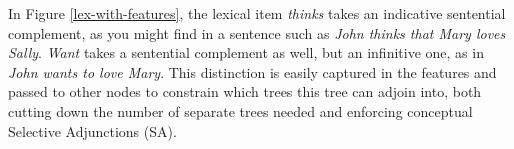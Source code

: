 In Figure \ref{lex-with-features}, the lexical item {\it thinks} takes an
indicative sentential complement, as you might find in a sentence such as {\it
John thinks that Mary loves Sally}.  {\it Want} takes a sentential complement
as well, but an infinitive one, as in {\it John wants to love Mary}.  This
distinction is easily captured in the features and passed to other nodes to
constrain which trees this tree can adjoin into, both cutting down the number
of separate trees needed and enforcing conceptual Selective Adjunctions (SA).



